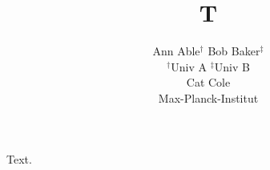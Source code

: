 \documentclass{article}
\title{T}
\author{Ann Able$^{\dagger}$ \quad Bob Baker$^{\ddagger}$ \\ $^\dagger$Univ A \quad $^\ddagger$Univ B \\ Cat Cole \\ Max-Planck-Institut}
\begin{document}
\maketitle
Text.
\end{document}
